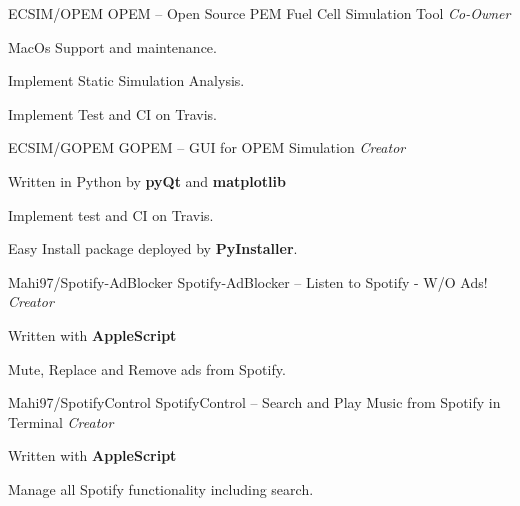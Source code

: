 \begin{cventries}
  \cventry
    {ECSIM/OPEM} %
    {OPEM -- Open Source PEM Fuel Cell Simulation Tool} %
    {\textit{Co-Owner}} %
    {} %
    {
      \begin{cvitems} %
        \item {MacOs Support and maintenance.}
        \item {Implement Static Simulation Analysis.}
        \item {Implement Test and CI on Travis.}
      \end{cvitems}
    }
        \newline
  \cventry
    {ECSIM/GOPEM} %
    {GOPEM -- GUI for OPEM Simulation} %
    {\textit{Creator}} %
    {} %
    {
      \begin{cvitems} %
        \item {Written in Python by \textbf{pyQt} and \textbf{matplotlib}}
        \item {Implement test and CI on Travis.}
        \item {Easy Install package deployed by \textbf{PyInstaller}.}
      \end{cvitems}
    }

  \cventry
    {Mahi97/Spotify-AdBlocker} %
    {Spotify-AdBlocker -- Listen to Spotify - W/O Ads!} %
    {\textit{Creator}} %
    {} %
    {
      \begin{cvitems} %
        \item {Written with \textbf{AppleScript}}
        \item {Mute, Replace and Remove ads from Spotify.}
      \end{cvitems}
    }

  \cventry
    {Mahi97/SpotifyControl} %
    {SpotifyControl -- Search and Play Music from Spotify in Terminal} %
    {\textit{Creator}} %
    {} %
    {
      \begin{cvitems} %
        \item {Written with \textbf{AppleScript}}
        \item {Manage all Spotify functionality including search.}
      \end{cvitems}
    }

\end{cventries}

